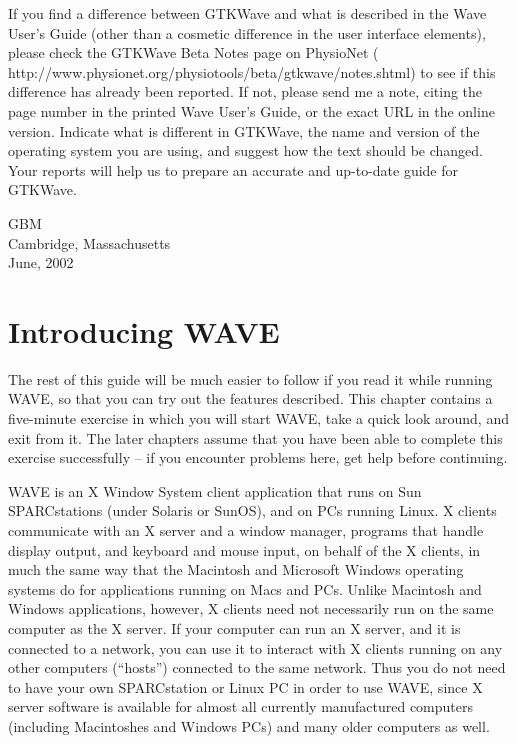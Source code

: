 \documentclass[twoside]{book}
\newcommand{\WAVE}{{\sf WAVE}\xspace}
\begin{document}
If you find a difference between GTKWave and what is described in the
Wave User's Guide (other than a cosmetic difference in the user
interface elements), please check the GTKWave Beta Notes
page on PhysioNet
(
{http://www.physionet.org/physiotools/beta/gtkwave/notes.shtml}) to see
if this difference has already been reported. If not, please send me a
note, citing the page number in the printed Wave User's Guide, or the
exact URL in the online version.  Indicate what is different in
GTKWave, the name and version of the operating system you are using,
and suggest how the text should be changed. Your reports will help us
to prepare an accurate and up-to-date guide for GTKWave.

\vspace{2em}
\noindent
GBM\\
Cambridge, Massachusetts\\
June, 2002

\chapter{Introducing \WAVE{}}

The rest of this guide will be much easier to follow if you read it
while running \WAVE{}, so that you can try out the features
described.  This chapter contains a five-minute exercise in which you
will start \WAVE{}, take a quick look around, and exit from it.
The later chapters assume that you have been able to complete this
exercise successfully -- if you encounter problems here, get help
before continuing.

\vspace{5mm}


\WAVE{} is an X Window System client application that runs on Sun
SPARCstations (under Solaris or SunOS), and on PCs running Linux.  X
clients communicate with an X server and a window manager, programs
that handle display output, and keyboard and mouse input, on behalf
of the X clients, in much the same way that the Macintosh and
Microsoft Windows operating systems do for applications running on
Macs and PCs.  Unlike Macintosh and Windows applications, however, X
clients need not necessarily run on the same computer as the X server.
If your computer can run an X server, and it is connected to a
network, you can use it to interact with X clients running on any
other computers (``hosts'') connected to the same network.  Thus you
do not need to have your own SPARCstation or Linux PC in order to use
\WAVE{}, since X server software is available for almost all
currently manufactured computers (including Macintoshes and Windows
PCs) and many older computers as well.
\end{document}
